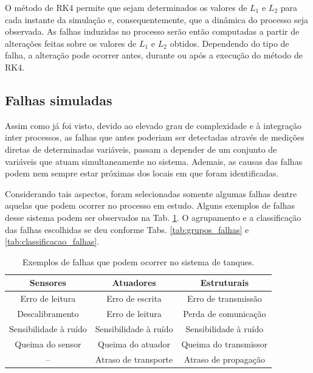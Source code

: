 O método de RK4 permite que sejam determinados os valores de $L_1$ e $L_2$ para
cada instante da simulação e, consequentemente, que a dinâmica do processo seja
observada. As falhas induzidas no processo serão então computadas a partir de
alterações feitas sobre os valores de $L_1$ e $L_2$ obtidos. Dependendo do tipo
de falha, a alteração pode ocorrer antes, durante ou após a execução do método
de RK4.

\subsection{Falhas simuladas}
Assim como já foi visto, devido ao elevado grau de complexidade e à integração
inter processos, as falhas que antes poderiam ser detectadas através de medições
diretas de determinadas variáveis, passam a depender de um conjunto de variáveis
que atuam simultaneamente no sistema.  Ademais, as causas das falhas podem nem
sempre estar próximas dos locais em que foram identificadas.

Considerando tais aspectos, foram selecionadas somente algumas falhas dentre
aquelas que podem ocorrer no processo em estudo. Alguns exemplos de falhas desse
sistema podem ser observados na Tab. \ref{tab:selecao_falhas}. O agrupamento e a
classificação das falhas escolhidas se deu conforme Tabs.
\ref{tab:grupos_falhas} e \ref{tab:classificacao_falhas}.

\begin{table}[!htb]
\centering
\caption{Exemplos de falhas que podem ocorrer no sistema de tanques.}
\label{tab:selecao_falhas}
\vspace{0.25cm}
\begin{tabular}{|c|c|c|}
\hline
{\bf Sensores} & {\bf Atuadores} & {\bf Estruturais}\\
\hline
\hline
Erro de leitura & Erro de escrita & Erro de transmissão\\
\hline
Descalibramento & Erro de leitura & Perda de comunicação\\
\hline
Sensibilidade à ruído & Sensibilidade à ruído & Sensibilidade à ruído\\
\hline
Queima do sensor & Queima do atuador & Queima do transmissor\\
\hline
-- & Atraso de transporte & Atraso de propagação\\
\hline
\end{tabular}
\end{table}

